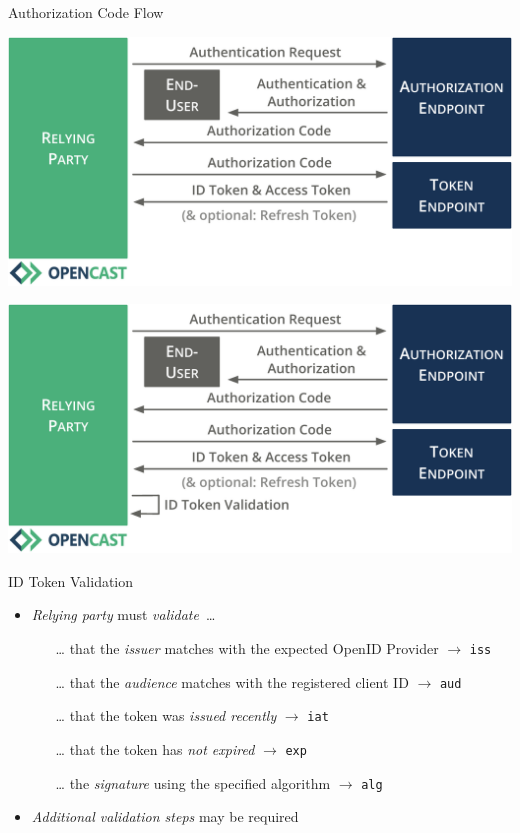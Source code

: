 \documentclass[aspectratio=169]{beamer}
\begin{document}
\begin{frame}{Authorization Code Flow}
	\vspace*{0.2em}
	\begin{overprint}
		\centerline{\includegraphics[height=0.84\textheight]{figures/authorization-code-flow-5}}
		\centerline{\includegraphics[height=0.84\textheight]{figures/authorization-code-flow-6}}
	\end{overprint}
	\vspace{-1.8em}
\end{frame}

\begin{frame}{ID Token Validation}
	\begin{itemize}
		\item \emph{Relying party} must \emph{validate}~\dots
		\begin{itemize}
			\item[\dots] that the \emph{issuer} matches with the expected OpenID Provider \hfill $\to$ \texttt{iss}
			\item[\dots] that the \emph{audience} matches with the registered client ID \hfill $\to$ \texttt{aud}
			\item[\dots] that the token was \emph{issued recently} \hfill $\to$ \texttt{iat}
			\item[\dots] that the token has \emph{not expired} \hfill $\to$ \texttt{exp}
			\item[\dots] the \emph{signature} using the specified algorithm \hfill $\to$ \texttt{alg}
		\end{itemize}
		\item \emph{Additional validation steps} may be required
	\end{itemize}
\end{frame}
\end{document}
